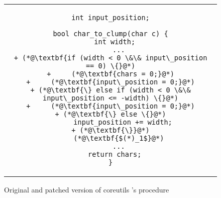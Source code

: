 \begin{figure}[H]
\begin{tabular}{c}
\begin{lstlisting}
int input_position;

bool char_to_clump(char c) {
  int width;
    ...
+ (*@\textbf{if (width < 0 \&\& input\_position == 0) \{}@*)
+     (*@\textbf{chars = 0;}@*)
+     (*@\textbf{input\_position = 0;}@*)
+ (*@\textbf{\} else if (width < 0 \&\& input\_position <= -width) \{}@*)
+     (*@\textbf{input\_position = 0;}@*)
+ (*@\textbf{\} else \{}@*)
      input_position += width;
+ (*@\textbf{\}}@*)
    (*@\textbf{$(*)_1$}@*)
    ...
  return chars;
}
\end{lstlisting}
\end{tabular}
\caption{Original and patched version of coreutils 's  procedure}
\end{figure} 